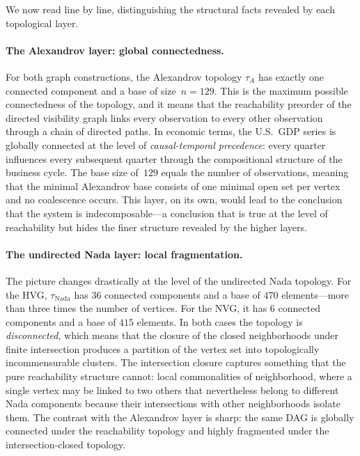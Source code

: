 \documentclass[11pt,a4paper]{article}
\theoremstyle{plain}
\theoremstyle{definition}
\begin{document}
We now read  line by line, distinguishing the
structural facts revealed by each topological layer.

\paragraph{The Alexandrov layer: global connectedness.}
For both graph constructions, the Alexandrov topology $\tau_A$ has
exactly one connected component and a base of size~$n = 129$. This is
the maximum possible connectedness of the topology, and it means that
the reachability preorder of the directed visibility graph links every
observation to every other observation through a chain of directed
paths. In economic terms, the U.S.\ GDP series is globally connected at
the level of \emph{causal-temporal precedence}: every quarter influences
every subsequent quarter through the compositional structure of the
business cycle. The base size of~$129$ equals the number of observations,
meaning that the minimal Alexandrov base consists of one minimal open
set per vertex and no coalescence occurs. This layer, on its own, would
lead to the conclusion that the system is indecomposable---a conclusion
that is true at the level of reachability but hides the finer structure
revealed by the higher layers.

\paragraph{The undirected Nada layer: local fragmentation.}
The picture changes drastically at the level of the undirected Nada
topology. For the HVG, $\tau_{\text{Nada}}$ has $36$ connected
components and a base of $470$ elements---more than three times the
number of vertices. For the NVG, it has $6$ connected components and a
base of $415$ elements. In both cases the topology is
\emph{disconnected}, which means that the closure of the closed
neighborhoods under finite intersection produces a partition of the
vertex set into topologically incommensurable clusters. The intersection
closure captures something that the pure reachability structure cannot:
local commonalities of neighborhood, where a single vertex may be linked
to two others that nevertheless belong to different Nada components
because their intersections with other neighborhoods isolate them. The
contrast with the Alexandrov layer is sharp: the same DAG is globally
connected under the reachability topology and highly fragmented under
the intersection-closed topology.
\end{document}
